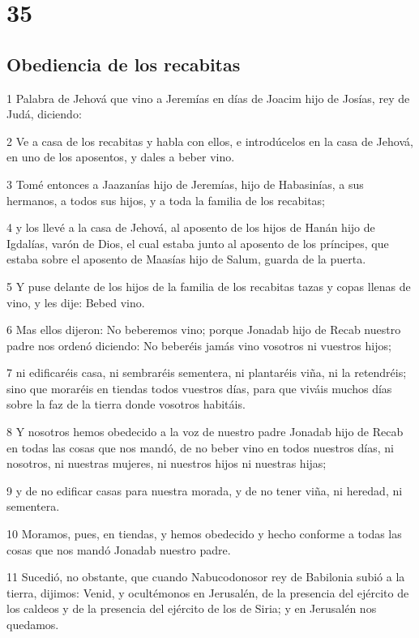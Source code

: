 \chapter{35}

\section*{Obediencia de los recabitas}

\par 1 Palabra de Jehová que vino a Jeremías en días de Joacim hijo de Josías, rey de Judá, diciendo:
\par 2 Ve a casa de los recabitas y habla con ellos, e introdúcelos en la casa de Jehová, en uno de los aposentos, y dales a beber vino.
\par 3 Tomé entonces a Jaazanías hijo de Jeremías, hijo de Habasinías, a sus hermanos, a todos sus hijos, y a toda la familia de los recabitas;
\par 4 y los llevé a la casa de Jehová, al aposento de los hijos de Hanán hijo de Igdalías, varón de Dios, el cual estaba junto al aposento de los príncipes, que estaba sobre el aposento de Maasías hijo de Salum, guarda de la puerta.
\par 5 Y puse delante de los hijos de la familia de los recabitas tazas y copas llenas de vino, y les dije: Bebed vino.
\par 6 Mas ellos dijeron: No beberemos vino; porque Jonadab hijo de Recab nuestro padre nos ordenó diciendo: No beberéis jamás vino vosotros ni vuestros hijos;
\par 7 ni edificaréis casa, ni sembraréis sementera, ni plantaréis viña, ni la retendréis; sino que moraréis en tiendas todos vuestros días, para que viváis muchos días sobre la faz de la tierra donde vosotros habitáis.
\par 8 Y nosotros hemos obedecido a la voz de nuestro padre Jonadab hijo de Recab en todas las cosas que nos mandó, de no beber vino en todos nuestros días, ni nosotros, ni nuestras mujeres, ni nuestros hijos ni nuestras hijas;
\par 9 y de no edificar casas para nuestra morada, y de no tener viña, ni heredad, ni sementera.
\par 10 Moramos, pues, en tiendas, y hemos obedecido y hecho conforme a todas las cosas que nos mandó Jonadab nuestro padre.
\par 11 Sucedió, no obstante, que cuando Nabucodonosor rey de Babilonia subió a la tierra, dijimos: Venid, y ocultémonos en Jerusalén, de la presencia del ejército de los caldeos y de la presencia del ejército de los de Siria; y en Jerusalén nos quedamos.
